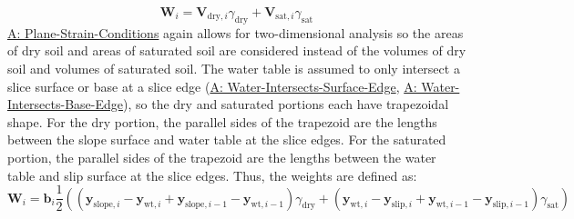 \documentclass[12pt]{article}
\begin{document}
\begin{displaymath}
{\mathbf{W}}_{i}={\mathbf{V}_{\text{dry},i}} {γ_{\text{dry}}}+{\mathbf{V}_{\text{sat},i}} {γ_{\text{sat}}}
\end{displaymath}
\hyperref[assumpPSC]{A: Plane-Strain-Conditions} again allows for two-dimensional analysis so the areas of dry soil and areas of saturated soil are considered instead of the volumes of dry soil and volumes of saturated soil. The water table is assumed to only intersect a slice surface or base at a slice edge (\hyperref[assumpWISE]{A: Water-Intersects-Surface-Edge}, \hyperref[assumpWIBE]{A: Water-Intersects-Base-Edge}), so the dry and saturated portions each have trapezoidal shape. For the dry portion, the parallel sides of the trapezoid are the lengths between the slope surface and water table at the slice edges. For the saturated portion, the parallel sides of the trapezoid are the lengths between the water table and slip surface at the slice edges. Thus, the weights are defined as:
\begin{displaymath}
{\mathbf{W}}_{i}={\mathbf{b}}_{i} \frac{1}{2} \left(\left({\mathbf{y}_{\text{slope},i}}-{\mathbf{y}_{\text{wt},i}}+{\mathbf{y}_{\text{slope},i-1}}-{\mathbf{y}_{\text{wt},i-1}}\right) {γ_{\text{dry}}}+\left({\mathbf{y}_{\text{wt},i}}-{\mathbf{y}_{\text{slip},i}}+{\mathbf{y}_{\text{wt},i-1}}-{\mathbf{y}_{\text{slip},i-1}}\right) {γ_{\text{sat}}}\right)
\end{displaymath}
\par~
\end{document}
